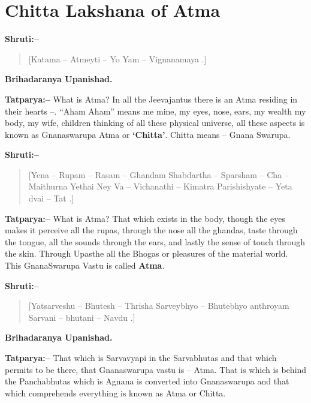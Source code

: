 \chapter{Chitta Lakshana of Atma}

\textbf{Shruti:–}

\begin{verse}
[Katama – Atmeyti – Yo Yam – Vignanamaya .]
\end{verse}

\begin{flushright}
\textbf{Brihadaranya Upanishad.}
\end{flushright}

\textbf{Tatparya:–} What is Atma? In all the Jeevajantus there is an Atma residing in their hearts –. “Aham Aham” means me mine, my eyes, nose, ears, my wealth my body, my wife, children thinking of all these physical universe, all these aspects is known as Gnanaswarupa Atma or \textbf{‘Chitta’}. Chitta means – Gnana Swarupa.

\textbf{Shruti:–}

\begin{verse}
[Yena – Rupam – Rasam – Ghandam Shabdartha – Sparsham – Cha – Maithurna  Yethai Ney Va – Vichanathi – Kimatra Parishishyate – Yeta dvai – Tat .]
\end{verse}

\textbf{Tatparya:–} What is Atma? That which exists in the body, though the eyes makes it perceive all the rupas, through the nose all the ghandas, taste through the tongue, all the sounds through the ears, and lastly the sense of touch through the skin. Through Upasthe all the Bhogas or pleasures of the material world. This GnanaSwarupa Vastu is called \textbf{Atma}.

\textbf{Shruti:–}

\begin{verse}
[Yatsarveshu – Bhutesh – Thrisha Sarveybhyo – Bhutebhyo anthroyam  Sarvani – bhutani – Navdu .]
\end{verse}

\begin{flushright}
\textbf{Brihadaranya Upanishad.}
\end{flushright}

\textbf{Tatparya:–} That which is Sarvavyapi in the Sarvabhutas and that which permits to be there, that Gnanaswarupa vastu is – Atma. That is which is behind the Panchabhutas which is Agnana is converted into Gnanaswarupa and that which comprehends everything is known as Atma or Chitta.

